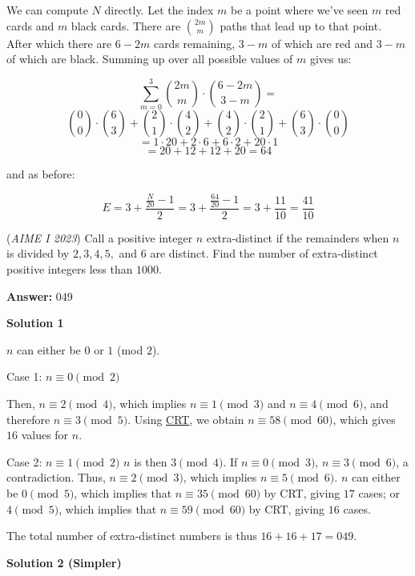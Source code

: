 \begin{enumerate}
{{ We can compute $N$ directly.  Let the index $m$ be a point where we've seen $m$ red cards and $m$ black cards.  There are $\binom{2m}{m}$ paths that lead up to that point. After which there are $6-2m$ cards remaining, $3-m$ of which are red and $3-m$ of which are black.  Summing up over all possible values of $m$ gives us:

 
 \[ \sum_{m=0}^{3} \binom{2m}{m} \cdot \binom{6-2m}{3-m} =  \] \[ \binom{0}{0} \cdot \binom{6}{3} + \binom{2}{1} \cdot \binom{4}{2} + \binom{4}{2} \cdot \binom{2}{1} + \binom{6}{3} \cdot \binom{0}{0} \] \[ = 1 \cdot 20 + 2 \cdot 6 + 6 \cdot 2 + 20 \cdot 1  \] \[ = 20 + 12 + 12 + 20 = 64 \]

 and as before:

 
 \[E=3 + \frac{\frac{N}{20}-1}{2}=3 + \frac{\frac{64}{20}-1}{2}=3+\frac{11}{10}=\frac{41}{10}\]



	\item (\textit{AIME I 2023}) Call a positive integer $n$ extra-distinct if the remainders when $n$ is divided by $2, 3, 4, 5,$ and $6$ are distinct. Find the number of extra-distinct positive integers less than $1000$.


 
 \textbf{Answer: }049



\textbf{Solution 1}

$n$ can either be $0$ or $1$ (mod $2$).

 Case 1: $n \equiv 0 \pmod{2}$

 Then, $n \equiv 2 \pmod{4}$, which implies $n \equiv 1 \pmod{3}$ and $n \equiv 4 \pmod{6}$, and therefore $n \equiv 3 \pmod{5}$. Using \href{https://artofproblemsolving.com/wiki/index.php?title=Chinese\_Remainder\_Theorem}{CRT}, we obtain $n \equiv 58 \pmod{60}$, which gives $16$ values for $n$.

 Case 2: $n \equiv 1 \pmod{2}$
$n$ is then $3 \pmod{4}$. If $n \equiv 0 \pmod{3}$, $n \equiv 3 \pmod{6}$, a contradiction. Thus, $n \equiv 2 \pmod{3}$, which implies $n \equiv 5 \pmod{6}$. $n$ can either be $0 \pmod{5}$, which implies that $n \equiv 35 \pmod{60}$ by CRT, giving $17$ cases; or $4 \pmod{5}$, which implies that $n \equiv 59 \pmod{60}$ by CRT, giving $16$ cases.

 The total number of extra-distinct numbers is thus $16 + 16 + 17 = \boxed{049}$.

 



\textbf{Solution 2 (Simpler)}

}}
\end{enumerate}
